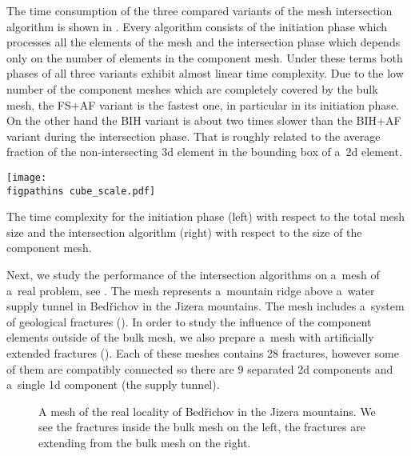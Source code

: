 The time consumption of the three compared variants
of the mesh intersection algorithm is shown in .
Every algorithm consists of the initiation phase which processes all the elements of the mesh 
and the intersection phase which depends only on the number of elements in the component mesh.
Under these terms both phases of all three variants exhibit almost 
linear time complexity. Due to the low number of the component meshes which are completely covered by the bulk mesh,
the FS+AF variant is the fastest one, in particular in its initiation phase.
On the other hand the BIH variant is about two times slower than the BIH+AF variant during the intersection phase. 
That is roughly related to the average fraction of the non-intersecting 3d element in the bounding box of a~2d element.
  
\begin{graph}[!htb]
    \centering
    \texttt{[image: \\figpathins cube\_scale.pdf]}
    \caption[Time complexity of intersection algorithms.]
    {The time complexity for the initiation phase (left) with respect to the total mesh size
        and the intersection algorithm (right) with respect to the size of the component mesh.}
    \label{graph:cube_speed}
\end{graph}



Next, we study the performance of the intersection algorithms on a~mesh of a~real problem, see .
The mesh represents a~mountain ridge above a~water supply tunnel in Bed{\v r}ichov in the Jizera mountains.
The mesh includes a~system of geological fractures ().
In order to study the influence of the component elements outside of
the bulk mesh, we also prepare a~mesh with artificially extended fractures (). 
Each of these meshes contains 28 fractures, however some of them are compatibly connected so there are 9 separated 2d components
and a~single 1d component (the supply tunnel).
%
\begin{figure}[!htb]
    \caption[Mesh of the real locality of Bed{\v r}ichov in the Jizera mountains.]
    {A mesh of the real locality of Bed{\v r}ichov in the Jizera mountains.
             We see the fractures inside the bulk mesh on the left,
             the fractures are extending from the bulk mesh on the right.}
    \label{fig:bedrichov_meshes}
\end{figure}

